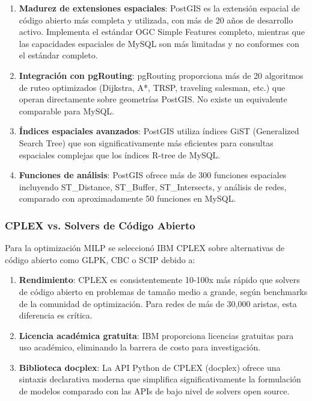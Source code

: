 \documentclass[conference]{IEEEtran}
\begin{document}
\begin{enumerate}
    \item \textbf{Madurez de extensiones espaciales}: PostGIS es la extensión espacial de código abierto más completa y utilizada, con más de 20 años de desarrollo activo. Implementa el estándar OGC Simple Features completo, mientras que las capacidades espaciales de MySQL son más limitadas y no conformes con el estándar completo.

    \item \textbf{Integración con pgRouting}: pgRouting proporciona más de 20 algoritmos de ruteo optimizados (Dijkstra, A*, TRSP, traveling salesman, etc.) que operan directamente sobre geometrías PostGIS. No existe un equivalente comparable para MySQL.

    \item \textbf{Índices espaciales avanzados}: PostGIS utiliza índices GiST (Generalized Search Tree) que son significativamente más eficientes para consultas espaciales complejas que los índices R-tree de MySQL.

    \item \textbf{Funciones de análisis}: PostGIS ofrece más de 300 funciones espaciales incluyendo ST\_Distance, ST\_Buffer, ST\_Intersects, y análisis de redes, comparado con aproximadamente 50 funciones en MySQL.
\end{enumerate}

\subsubsection{CPLEX vs. Solvers de Código Abierto}

Para la optimización MILP se seleccionó IBM CPLEX sobre alternativas de código abierto como GLPK, CBC o SCIP debido a:

\begin{enumerate}
    \item \textbf{Rendimiento}: CPLEX es consistentemente 10-100x más rápido que solvers de código abierto en problemas de tamaño medio a grande, según benchmarks de la comunidad de optimización. Para redes de más de 30,000 aristas, esta diferencia es crítica.

    \item \textbf{Licencia académica gratuita}: IBM proporciona licencias gratuitas para uso académico, eliminando la barrera de costo para investigación.

    \item \textbf{Biblioteca docplex}: La API Python de CPLEX (docplex) ofrece una sintaxis declarativa moderna que simplifica significativamente la formulación de modelos comparado con las APIs de bajo nivel de solvers open source.
\end{enumerate}
\end{document}
